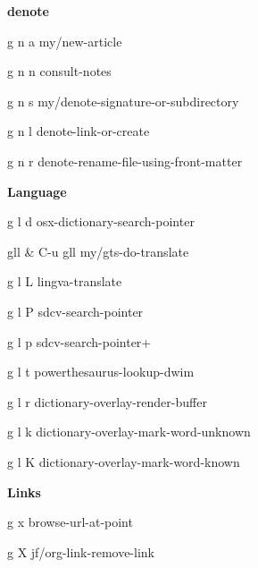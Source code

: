 \documentclass[10pt]{article}
\renewcommand\subsection[1]{\smallskip\par\textbf{\color{heading}#1}}
\begin{document}
\begin{multicols}{4}
  \subsection{denote}
  \begin{keylist}
    \item[g n a] my/new-article
    \item[g n n] consult-notes
    \item[g n s] my/denote-signature-or-subdirectory
    \item[g n l] denote-link-or-create
    \item[g n r] denote-rename-file-using-front-matter
  \end{keylist}

  \subsection{Language}
  \begin{keylist}
    \item[g l d] osx-dictionary-search-pointer
    \item[gll \& C-u gll] my/gts-do-translate
    \item[g l L] lingva-translate
    \item[g l P] sdcv-search-pointer
    \item[g l p] sdcv-search-pointer+
    \item[g l t] powerthesaurus-lookup-dwim
    \item[g l r] dictionary-overlay-render-buffer
    \item[g l k] dictionary-overlay-mark-word-unknown
    \item[g l K] dictionary-overlay-mark-word-known
  \end{keylist}
  \subsection{Links}
  \begin{keylist}
    \item[g x] browse-url-at-point
    \item[g X] jf/org-link-remove-link
  \end{keylist}
\end{multicols}
\end{document}
